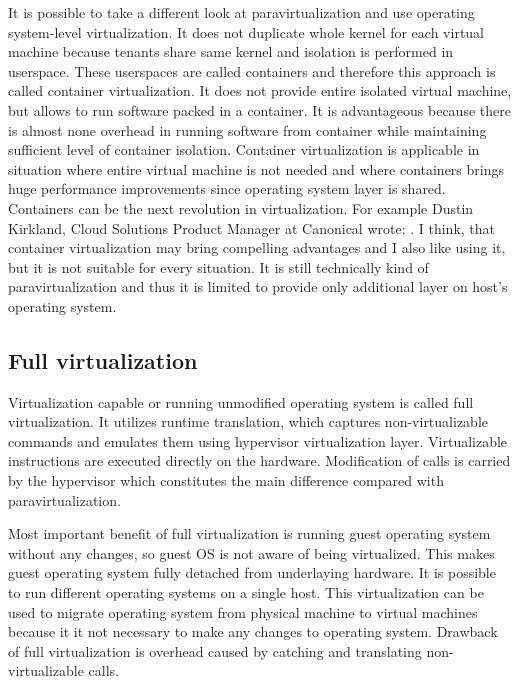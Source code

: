 It is possible to take a different look at paravirtualization and 
use operating system-level virtualization. It does not duplicate whole kernel for each virtual machine because tenants share same kernel and isolation is performed in userspace. These userspaces are called containers and therefore this approach is called container virtualization. It does not provide entire isolated virtual machine, but allows to run software packed in a container. It is advantageous because there is almost none overhead in running software from container while maintaining sufficient level of container isolation. Container virtualization is applicable in situation where entire virtual machine is not needed and where containers brings huge performance improvements since operating system layer is shared. Containers can be the next revolution in virtualization. For example Dustin Kirkland, Cloud Solutions Product Manager at Canonical wrote:  \cite{ubuntu-docker}. I think, that container virtualization may bring compelling advantages and I also like using it, but it is not suitable for every situation. It is still technically kind of paravirtualization and thus it is limited to provide only additional layer on host's operating system.

\subsection{Full virtualization}
Virtualization capable or running unmodified operating system is called full virtualization. It utilizes runtime translation, which captures non-virtualizable commands and emulates them using hypervisor virtualization layer. Virtualizable instructions are executed directly on the hardware. Modification of  calls is carried by the hypervisor which constitutes the main difference compared with paravirtualization. 

Most important benefit of full virtualization is running guest operating system without any changes, so guest \Ac{OS} is not aware of being virtualized. This makes guest operating system fully detached from underlaying hardware. It is possible to run different operating systems on a single host. This virtualization can be used to migrate operating system from physical machine to virtual machines because it it not necessary to make any changes to operating system. Drawback of full virtualization is overhead caused by catching and translating non-virtualizable calls. 

